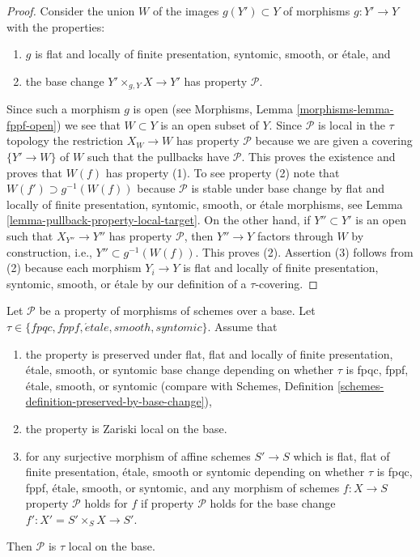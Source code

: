 \begin{proof}
Consider the union $W$ of the images $g(Y') \subset Y$ of
morphisms $g : Y' \to Y$ with the properties:
\begin{enumerate}
\item $g$ is flat and locally of finite presentation, syntomic,
smooth, or \'etale, and
\item the base change $Y' \times_{g, Y} X \to Y'$ has property
$\mathcal{P}$.
\end{enumerate}
Since such a morphism $g$ is open (see
Morphisms, Lemma \ref{morphisms-lemma-fppf-open})
we see that $W \subset Y$ is an open subset of $Y$. Since $\mathcal{P}$
is local in the $\tau$ topology the restriction $X_W \to W$ has property
$\mathcal{P}$ because we are given a covering $\{Y' \to W\}$ of $W$ such that
the pullbacks have $\mathcal{P}$. This proves the existence and proves
that $W(f)$ has property (1). To see property (2) note that
$W(f') \supset g^{-1}(W(f))$ because $\mathcal{P}$ is stable under
base change by flat and locally of finite presentation,
syntomic, smooth, or \'etale morphisms, see
Lemma \ref{lemma-pullback-property-local-target}.
On the other hand, if $Y'' \subset Y'$ is an open such that
$X_{Y''} \to Y''$ has property $\mathcal{P}$, then $Y'' \to Y$ factors
through $W$ by construction, i.e., $Y'' \subset g^{-1}(W(f))$. This
proves (2). Assertion (3) follows from (2) because each morphism
$Y_i \to Y$ is flat and locally of finite presentation, syntomic,
smooth, or \'etale by our definition of a $\tau$-covering.
\end{proof}

\begin{lemma}
\label{lemma-descending-properties-morphisms}
Let $\mathcal{P}$ be a property of morphisms of schemes over a base.
Let $\tau \in \{fpqc, fppf, \acute{e}tale, smooth, syntomic\}$.
Assume that
\begin{enumerate}
\item the property is preserved under
flat, flat and locally of finite presentation, \'etale, smooth, or syntomic
base change depending on whether $\tau$ is fpqc, fppf, \'etale, smooth, or
syntomic (compare with
Schemes, Definition \ref{schemes-definition-preserved-by-base-change}),
\item the property is Zariski local on the base.
\item for any surjective morphism of affine schemes $S' \to S$
which is flat, flat of finite presentation,
\'etale, smooth or syntomic depending on whether $\tau$ is
fpqc, fppf, \'etale, smooth, or syntomic,
and any morphism of schemes $f : X \to S$ property
$\mathcal{P}$ holds for $f$ if property $\mathcal{P}$
holds for the base change $f' : X' = S' \times_S X \to S'$.
\end{enumerate}
Then $\mathcal{P}$ is $\tau$ local on the base.
\end{lemma}

